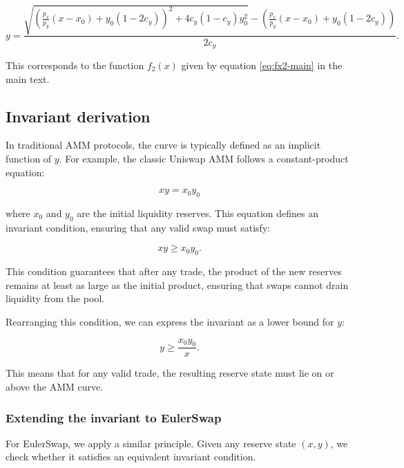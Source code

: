 \documentclass{article}
\begin{document}
\begin{equation}
    \label{eq:EulerSwap-2}
    y = \frac{
        \sqrt{
            \left( \frac{p_x}{p_y} (x - x_0) + y_0 (1 - 2c_y) \right)^2 
            + 4c_y (1 - c_y) y_0^2
        } 
        - \left( \frac{p_x}{p_y} (x - x_0) + y_0 (1 - 2c_y) \right)
    }{2c_y}.
\end{equation}

This corresponds to the function \( f_2(x) \) given by equation \eqref{eq:fx2-main} in the main text.

\subsection{Invariant derivation}
\label{sec:invariant-derivation}

In traditional AMM protocols, the curve is typically defined as an implicit function of $y$. For example, the classic Uniswap AMM follows a constant-product equation:

\begin{equation}
    xy = x_0 y_0
\end{equation}

where $x_0$ and $y_0$ are the initial liquidity reserves. This equation defines an invariant condition, ensuring that any valid swap must satisfy:

\begin{equation}
    xy \geq x_0 y_0.
\end{equation}

This condition guarantees that after any trade, the product of the new reserves remains at least as large as the initial product, ensuring that swaps cannot drain liquidity from the pool.

Rearranging this condition, we can express the invariant as a lower bound for $y$:

\begin{equation}
    y \geq \frac{x_0 y_0}{x}.
\end{equation}

This means that for any valid trade, the resulting reserve state must lie on or above the AMM curve.  

\subsubsection{Extending the invariant to EulerSwap}

For EulerSwap, we apply a similar principle. Given any reserve state $(x, y)$, we check whether it satisfies an equivalent invariant condition.
\end{document}
